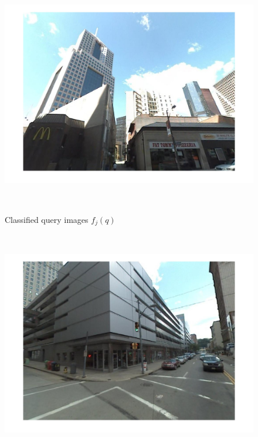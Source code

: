 \begin{figure}
\begin{minipage}{0.48\linewidth}
\begin{minipage}{\wii}
            \includegraphics[width=\linewidth]{imgs/wVS3q/2932/j.jpg}
          \end{minipage}  
          \vspace{3mm}
          \\
          \centerline{\scriptsize Classified query images $f_j(q)$} 
          \\
          \begin{minipage}{\wii}
            \centering
            \includegraphics[width=\linewidth]{imgs/wVS3q/2932/a.jpg}
          \end{minipage}  
          \begin{minipage}{\wii}
            \centering

\end{minipage}
\end{minipage}
\end{figure}
